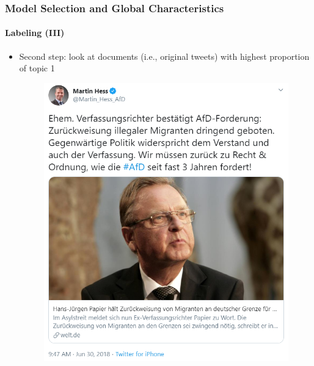 \documentclass[xcolor=dvipsnames]{beamer}
\begin{document}
\begin{frame}
\frametitle{Model Selection and Global Characteristics}
\framesubtitle{Labeling (III)}
\begin{itemize}
\item Second step: look at documents (i.e., original tweets) with highest proportion of topic 1
	\begin{figure}[h!]
  	\centering
  	\includegraphics[scale = 0.40]{../plots/presentation/martin_hess_topic1.png}
	\end{figure}
\end{itemize}
\end{frame}
\end{document}
